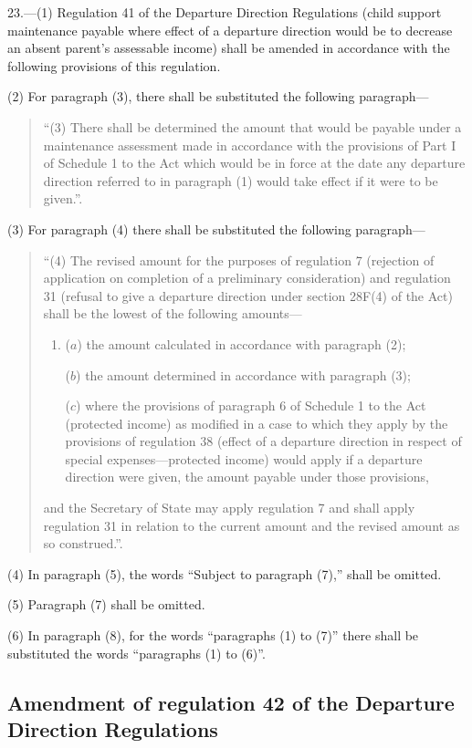 \documentclass[12pt,a4paper]{article}
\begin{document}
23.—(1) Regulation 41 of the Departure Direction Regulations (child support maintenance payable where effect of a departure direction would be to decrease an absent parent’s assessable income) shall be amended in accordance with the following provisions of this regulation.

(2) For paragraph (3), there shall be substituted the following paragraph—
\begin{quotation}
“(3) There shall be determined the amount that would be payable under a maintenance assessment made in accordance with the provisions of Part I of Schedule 1 to the Act which would be in force at the date any departure direction referred to in paragraph (1) would take effect if it were to be given.”.
\end{quotation}

(3) For paragraph (4) there shall be substituted the following paragraph—
\begin{quotation}
“(4) The revised amount for the purposes of regulation 7 (rejection of application on completion of a preliminary consideration) and regulation 31 (refusal to give a departure direction under section 28F(4) of the Act) shall be the lowest of the following amounts—
\begin{enumerate}\item[]
($a$) the amount calculated in accordance with paragraph (2);

($b$) the amount determined in accordance with paragraph (3);

($c$) where the provisions of paragraph 6 of Schedule 1 to the Act (protected income) as modified in a case to which they apply by the provisions of regulation 38 (effect of a departure direction in respect of special expenses—protected income) would apply if a departure direction were given, the amount payable under those provisions,
\end{enumerate}
and the Secretary of State may apply regulation 7 and shall apply regulation 31 in relation to the current amount and the revised amount as so construed.”.
\end{quotation}

(4) In paragraph (5), the words “Subject to paragraph (7),” shall be omitted.

(5) Paragraph (7) shall be omitted.

(6) In paragraph (8), for the words “paragraphs (1) to (7)” there shall be substituted the words “paragraphs (1) to (6)”.

\subsection[24. Amendment of regulation 42 of the Departure Direction Regulations]{Amendment of regulation 42 of the Departure Direction Regulations}
\end{document}
